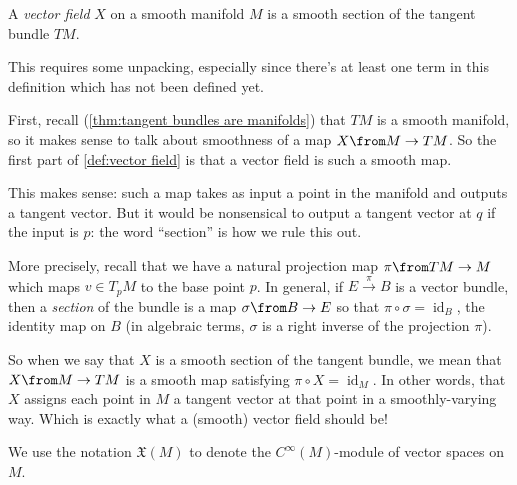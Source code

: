 \begin{definition}\label{def:vector field}
	A \emph{vector field} $X$ on a smooth manifold $M$ is a smooth section of the tangent bundle $TM$.
\end{definition}

This requires some unpacking, especially since there's at least one term in this definition which has not been defined yet.

First, recall (\cref{thm:tangent bundles are manifolds}) that $TM$ is a smooth manifold, so it makes sense to talk about smoothness of a map $X\from M \to TM$. So the first part of \cref{def:vector field} is that a vector field is such a smooth map.

This makes sense: such a map takes as input a point in the manifold and outputs a tangent vector. But it would be nonsensical to output a tangent vector at $q$ if the input is $p$: the word ``section'' is how we rule this out.

More precisely, recall that we have a natural projection map $\pi \from TM \to M$ which maps $v \in T_p M$ to the base point $p$. In general, if $E \stackrel{\pi}{\to}B$ is a vector bundle, then a \emph{section} of the bundle is a map $\sigma\from B \to E$ so that $\pi \circ \sigma = \operatorname{id}_B$, the identity map on $B$ (in algebraic terms, $\sigma$ is a right inverse of the projection $\pi$).

So when we say that $X$ is a smooth section of the tangent bundle, we mean that $X \from M \to TM$ is a smooth map satisfying $\pi \circ X = \operatorname{id}_M$. In other words, that $X$ assigns each point in $M$ a tangent vector at that point in a smoothly-varying way. Which is exactly what a (smooth) vector field should be!

\begin{notation}
	We use the notation $\mathfrak{X}(M)$ to denote the $C^{\infty}(M)$-module of vector spaces on $M$.
\end{notation}

